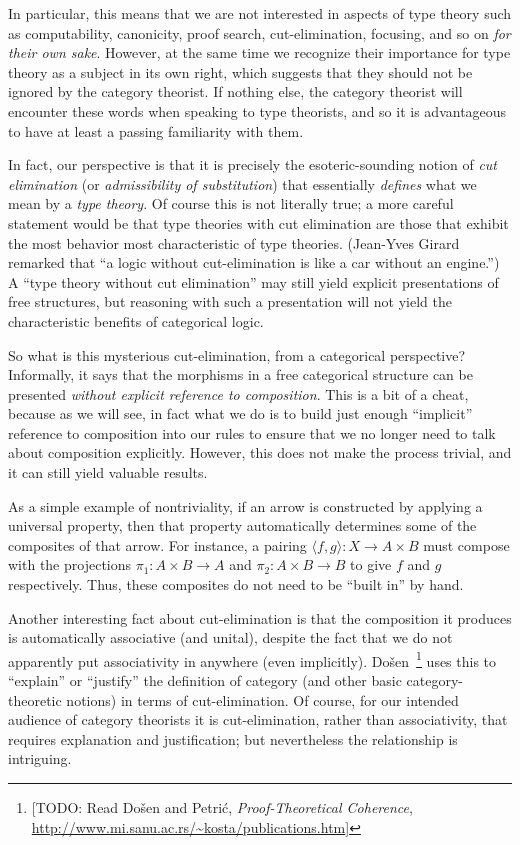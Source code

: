 \documentclass{book}
\def\pair#1#2{\langle #1,#2\rangle}
\begin{document}
In particular, this means that we are not interested in aspects of type theory such as computability, canonicity, proof search, cut-elimination, focusing, and so on \emph{for their own sake}.
However, at the same time we recognize their importance for type theory as a subject in its own right, which suggests that they should not be ignored by the category theorist.
If nothing else, the category theorist will encounter these words when speaking to type theorists, and so it is advantageous to have at least a passing familiarity with them.

In fact, our perspective is that it is precisely the esoteric-sounding notion of \emph{cut elimination} (or \emph{admissibility of substitution}) that essentially \emph{defines} what we mean by a \emph{type theory}.
Of course this is not literally true; a more careful statement would be that type theories with cut elimination are those that exhibit the most behavior most characteristic of type theories.
(Jean-Yves Girard remarked that ``a logic without cut-elimination is like a car without an engine.'')
A ``type theory without cut elimination'' may still yield explicit presentations of free structures, but reasoning with such a presentation will not yield the characteristic benefits of categorical logic.

So what is this mysterious cut-elimination, from a categorical perspective?
Informally, it says that the morphisms in a free categorical structure can be presented \emph{without explicit reference to composition}.
This is a bit of a cheat, because as we will see, in fact what we do is to build just enough ``implicit'' reference to composition into our rules to ensure that we no longer need to talk about composition explicitly.
However, this does not make the process trivial, and it can still yield valuable results.

As a simple example of nontriviality, if an arrow is constructed by applying a universal property, then that property automatically determines some of the composites of that arrow.
For instance, a pairing $\pair{f}{g}:X\to A\times B$ must compose with the projections $\pi_1:A\times B\to A$ and $\pi_2:A\times B\to B$ to give $f$ and $g$ respectively.
Thus, these composites do not need to be ``built in'' by hand.

Another interesting fact about cut-elimination is that the composition it produces is automatically associative (and unital), despite the fact that we do not apparently put associativity in anywhere (even implicitly).
Do\v{s}en~\cite{dosen:cutelim-cats}\footnote{[TODO: Read Do\v{s}en and Petri\'{c}, \textit{Proof-Theoretical Coherence}, \url{http://www.mi.sanu.ac.rs/~kosta/publications.htm}]} uses this to ``explain'' or ``justify'' the definition of category (and other basic category-theoretic notions) in terms of cut-elimination.
Of course, for our intended audience of category theorists it is cut-elimination, rather than associativity, that requires explanation and justification; but nevertheless the relationship is intriguing.
\end{document}
